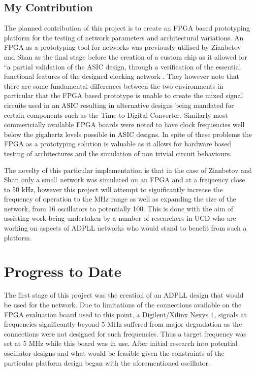\documentclass[11pt,english,british]{report}
\begin{document}
\section{My Contribution}
The planned contribution of this project is to create an FPGA based prototyping platform for the testing of network parameters and architectural variations. An FPGA as a prototyping tool for networks was previously utilised by Zianbetov and Shan as the final stage before the creation of a custom chip as it allowed for ``a partial validation of the ASIC design, through a verification of the essential functional features of the designed clocking network \cite{zianbetov2013phd,shan2014phd}. They however note that there are some fundamental differences between the two environments in particular that the FPGA based prototype is unable to create the mixed signal circuits used in an ASIC resulting in alternative designs being mandated for certain components such as the Time-to-Digital Converter. Similarly most commericially available FPGA boards were noted to have clock frequencies well below the gigahertz levels possible in ASIC designs. In spite of these problems the FPGA as a prototyping solution is valuable as it allows for hardware based testing of architectures and the simulation of non trivial circuit behaviours.

The novelty of this particular implementation is that in the case of Zianbetov and Shan only a small network was simulated on an FPGA and at a frequency close to 50 kHz, however this project will attempt to significantly increase the frequency of operation to the MHz range as well as expanding the size of the network, from 16 oscillators to potentially 100. This is done with the aim of assisting work being undertaken by a number of researchers in UCD who are working on aspects of ADPLL networks who would stand to benefit from such a platform.

\chapter{Progress to Date}
The first stage of this project was the creation of an ADPLL design that would be used for the network. Due to limitations of the connections available on the FPGA evaluation board used to this point, a Digilent/Xilinx Nexys 4, signals at frequencies significantly beyond 5 MHz suffered from major degradation as the connections were not designed for such frequencies. Thus a target frequency was set at 5 MHz while this board was in use. After initial research into potential oscillator designs and what would be feasible given the constraints of the particular platform design began with the aforementioned oscillator.
\end{document}
